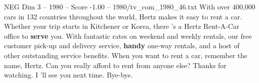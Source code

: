 \begin{textsample}{NEG Dim 3 – 1980 – Score -1.00 – 1980/tv\_com\_1980\_46.txt}  \label{ex:f3_neg_041}
With over 400,000 cars in 132 countries throughout the world, Hertz makes it easy to rent a car.
Whether your trip starts in Kitchener or Korea, there 's a Hertz Rent-A-Car office to \textbf{serve} you.
With fantastic rates on weekend and weekly rentals, our free customer pick-up and delivery service, \textbf{handy} one-way rentals, and a host of other outstanding service benefits.
When you want to rent a car, remember the name, Hertz.
Can you really afford to rent from anyone else?
Thanks for watching.
I 'll see you next time.
Bye-bye.

\end{textsample}
